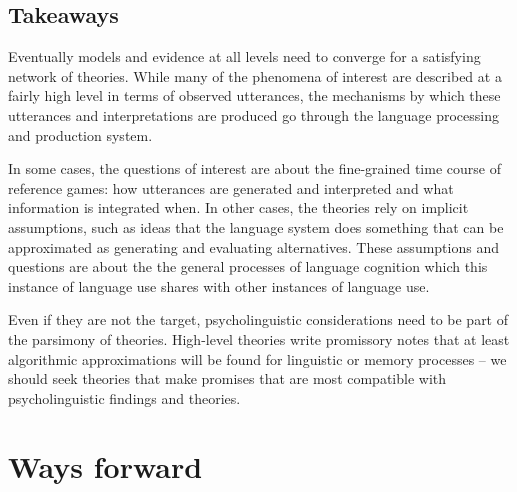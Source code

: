 \documentclass[]{article}
\begin{document}
\subsection{Takeaways}


Eventually models and evidence at all levels need to converge for a satisfying network of theories. While many of the phenomena of interest are described at a fairly high level in terms of observed utterances, the mechanisms by which these utterances and interpretations are produced go through the language processing and production system. 

In some cases, the questions of interest are about the fine-grained time course of reference games: how utterances are generated and interpreted and what information is integrated when. In other cases, the theories rely on implicit assumptions, such as ideas that the language system does something that can be approximated as generating and evaluating alternatives. These assumptions and questions are about the the general processes of language cognition which this instance of language use shares with other instances of language use.

Even if they are not the target, psycholinguistic considerations need to be part of the parsimony of theories. High-level theories write promissory notes that at least algorithmic approximations will be found for linguistic or memory processes -- we should seek theories that make promises that are most compatible with psycholinguistic findings and theories.  


\section{Ways forward}



	
\end{document}
